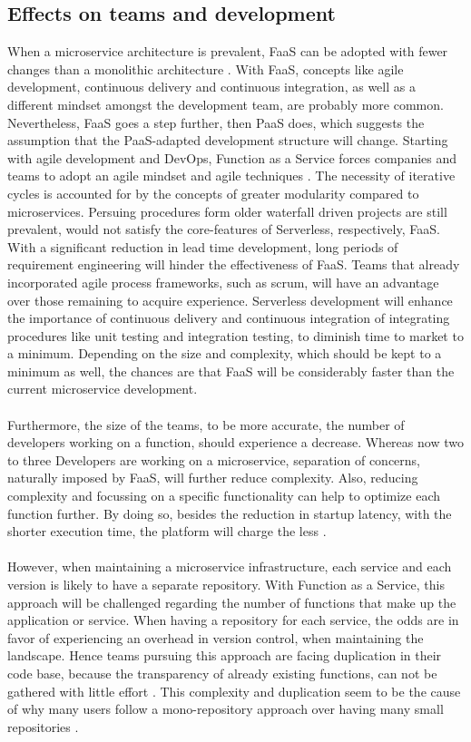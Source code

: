 \documentclass[11pt]{article}
\begin{document}
\subsection{Effects on teams and development}
When a microservice architecture is prevalent, FaaS can be adopted with fewer changes than a monolithic architecture \cite{fox2017status}. With FaaS, concepts like agile development, continuous delivery and continuous integration, as well as a different mindset amongst the development team, are probably more common. Nevertheless, FaaS goes a step further, then PaaS does, which suggests the assumption that the PaaS-adapted development structure will change. Starting with agile development and \glqq DevOps\grqq{}, Function as a Service forces companies and teams to adopt an agile mindset and agile techniques \cite{benlian2018transformative}. The necessity of iterative cycles is accounted for by the concepts of greater modularity compared to microservices. Persuing procedures form older waterfall driven projects are still prevalent, would not satisfy the core-features of Serverless, respectively, FaaS. With a significant reduction in lead time development, long periods of requirement engineering will hinder the effectiveness of FaaS. Teams that already incorporated agile process frameworks, such as scrum, will have an advantage over those remaining to acquire experience. Serverless development will enhance the importance of continuous delivery and continuous integration of integrating procedures like unit testing and integration testing, to diminish time to market to a minimum. Depending on the size and complexity, which should be kept to a minimum as well, the chances are that FaaS will be considerably faster than the current microservice development. \\\\
Furthermore, the size of the teams, to be more accurate, the number of developers working on a function, should experience a decrease. Whereas now two to three Developers are working on a microservice, separation of concerns, naturally imposed by FaaS, will further reduce complexity. Also, reducing complexity and focussing on a specific functionality can help to optimize each function further. By doing so, besides the reduction in startup latency, with the shorter execution time, the platform will charge the less \cite{shafiei2020serverless}. \\\\
However, when maintaining a microservice infrastructure, each service and each version is likely to have a separate repository. With Function as a Service, this approach will be challenged regarding the number of functions that make up the application or service. When having a repository for each service, the odds are in favor of experiencing an overhead in version control, when maintaining the landscape. Hence teams pursuing this approach are facing duplication in their code base, because the transparency of already existing functions, can not be gathered with little effort \cite{racicot2019quality}. This complexity and duplication seem to be the cause of why many users follow a mono-repository approach over having many small repositories \cite{brousse2019issue}. \\\\
\end{document}

